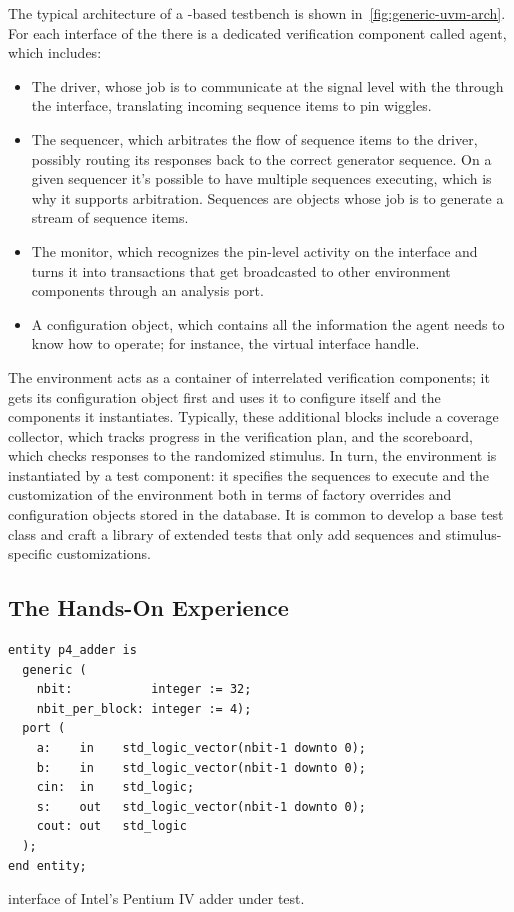 The typical architecture of a \uvm-based testbench is shown in~\cref{fig:generic-uvm-arch}. For each interface of the \dut there is a dedicated verification component called agent, which includes:
\begin{itemize}
    \item The driver, whose job is to communicate at the signal level with the \dut through the interface, translating incoming sequence items to pin wiggles.
    \item The sequencer, which arbitrates the flow of sequence items to the driver, possibly routing its responses back to the correct generator sequence. On a given sequencer it's possible to have multiple sequences executing, which is why it supports arbitration. Sequences are objects whose job is to generate a stream of sequence items.
    \item The monitor, which recognizes the pin-level activity on the interface and turns it into transactions that get broadcasted to other environment components through an analysis port.
    \item A configuration object, which contains all the information the agent needs to know how to operate; for instance, the virtual interface handle.
\end{itemize}
The environment acts as a container of interrelated verification components; it gets its configuration object first and uses it to configure itself and the components it instantiates. Typically, these additional blocks include a coverage collector, which tracks progress in the verification plan, and the scoreboard, which checks \dut responses to the randomized stimulus. In turn, the environment is instantiated by a test component: it specifies the sequences to execute and the customization of the environment both in terms of factory overrides and configuration objects stored in the database. It is common to develop a base test class and craft a library of extended tests that only add sequences and stimulus-specific customizations.

\subsection{The Hands-On Experience}\label{subsec:handson}

\begin{listing}
\begin{verbatim}
entity p4_adder is
  generic (
    nbit:           integer := 32;
    nbit_per_block: integer := 4);
  port (
    a:    in    std_logic_vector(nbit-1 downto 0);
    b:    in    std_logic_vector(nbit-1 downto 0);
    cin:  in    std_logic;
    s:    out   std_logic_vector(nbit-1 downto 0);
    cout: out   std_logic
  );
end entity;
\end{verbatim}
\caption{\vhdl interface of Intel's Pentium IV adder under test.}
\label{list:dut_p4}
\end{listing}

